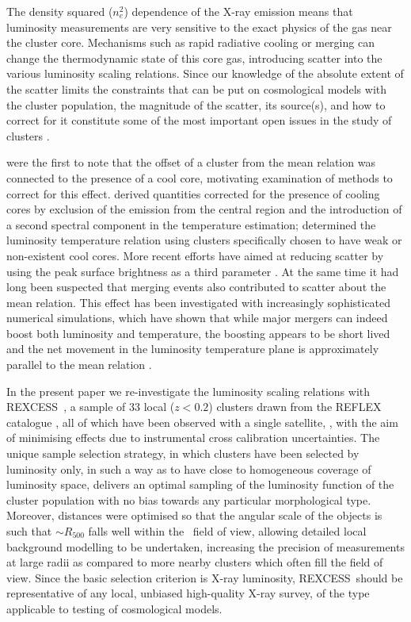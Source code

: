 \documentclass[oldversion]{aa}
\newcommand{\rexcess}{{\gwpfont REXCESS}}
\begin{document}
The density squared ($n_e^2$) dependence of the X-ray emission means that
luminosity measurements are very sensitive to the exact physics of the
gas near the cluster core. Mechanisms such as rapid radiative
cooling or merging can change the thermodynamic state of this core
gas, introducing scatter into the various luminosity scaling
relations. Since our knowledge of the absolute extent of the
scatter limits the constraints that can be put on cosmological models
with the cluster population, the magnitude of the scatter, its source(s),
and how to correct for it constitute some of the most important
open issues in the study of clusters \citep[see e.g.][]{lh05}. {\citet{fabian94} were the first to note that the offset of a cluster from the mean relation was connected to the presence of a cool
core, motivating examination of methods to correct for this
effect. \citet{mark98} derived quantities corrected for the presence
of cooling cores by exclusion of the emission from the central region
and the introduction of a second spectral component in the temperature estimation; \citet{ae99} determined the luminosity temperature relation
using clusters specifically chosen to have weak or non-existent cool
cores. More recent efforts have aimed at reducing scatter by using the peak surface brightness as a third parameter \citep{ohara06}. At the same time it had long been suspected that merging events also contributed to scatter about the mean relation. This effect has been  investigated with increasingly sophisticated numerical simulations, which have shown that while major mergers can indeed boost both luminosity and temperature, the boosting appears to be short lived and the net movement in the luminosity
temperature plane is approximately parallel to the mean relation
\citep{rs01,rt02, hart07}. 

In the
present paper we re-investigate the luminosity scaling relations with
\rexcess\ \citep{boehringer07}, a sample of 33 local ($z < 0.2$)
clusters drawn from the REFLEX catalogue \citep{reflex}, all of which
have been observed with a single satellite, \xmm, with the aim of minimising effects due to instrumental cross calibration uncertainties. The unique sample
selection strategy, in which clusters have been
selected by luminosity only, in such a 
way as to have close to homogeneous coverage of luminosity space,
delivers an optimal sampling of the luminosity function of the
cluster population with no bias towards any particular morphological type. Moreover, distances were optimised so that
the angular scale of the objects is such that $\sim R_{500}$ falls
well within the \xmm\ field of view, allowing detailed local background
modelling to be undertaken, increasing the precision of measurements
at large radii as compared to more nearby clusters which often fill
the field of view. Since the basic selection criterion is X-ray
luminosity, \rexcess\ should be representative of any local, unbiased
high-quality X-ray survey, of the type applicable to testing of
cosmological models. 

}
\end{document}
